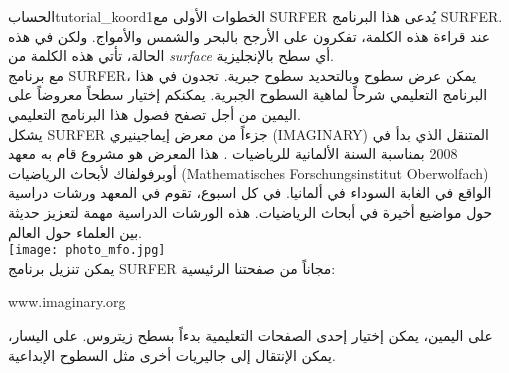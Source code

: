 \begin{surferIntroPage}{الحساب}{tutorial_koord1}{الخطوات الأولى مع SURFER}
يُدعى هذا البرنامج \textenglish{SURFER}. عند قراءة هذه الكلمة، تفكرون على الأرجح بالبحر والشمس والأمواج. ولكن في هذه الحالة، تأتي هذه الكلمة من \textenglish{\it surface} أي سطح بالإنجليزية.
\\
مع برنامج \textenglish{SURFER}، يمكن عرض سطوح وبالتحديد سطوح جبرية. تجدون في هذا البرنامج التعليمي شرحاً لماهية السطوح الجبرية. يمكنكم إختيار سطحاً معروضاً على اليمين من أجل تصفح فصول هذا البرنامج التعليمي.\\
يشكل \textenglish{SURFER} جزءاً من معرض إيماجينيري
 \textenglish{(IMAGINARY)}
  المتنقل الذي بدأ في 2008 بمناسبة السنة الألمانية للرياضيات . هذا المعرض هو مشروع قام به معهد أوبرفولفاك لأبحاث الرياضيات
\textenglish{(Mathematisches Forschungsinstitut Oberwolfach)}
 الواقع في الغابة السوداء في ألمانيا. في كل اسبوع، تقوم في المعهد ورشات دراسية حول مواضيع أخيرة في أبحاث الرياضيات. هذه الورشات الدراسية مهمة لتعزيز حديثة بين العلماء حول العالم. \\
\vspace{0.2cm} \hspace{3.5cm}\texttt{[image: photo\_mfo.jpg]}\\
يمكن تنزيل برنامج \textenglish{SURFER} مجاناً من صفحتنا الرئيسية: \\
\begin{centering}
\textenglish{www.imaginary.org}\\
\end{centering}
 \vspace{0.2cm}
على اليمين، يمكن إختيار إحدى الصفحات التعليمية بدءاً بسطح زيتروس.
  على اليسار، يمكن الإنتقال إلى جاليريات أخرى مثل السطوح الإبداعية.
\end{surferIntroPage}
